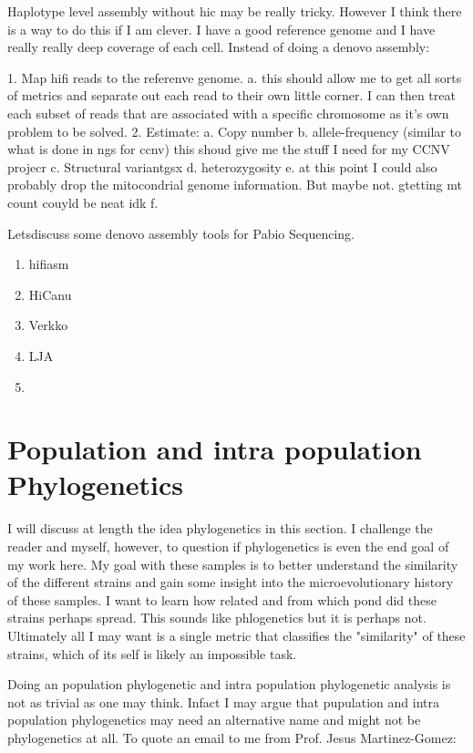 \documentclass{article}
\begin{document}
    Haplotype level assembly without hic may be really tricky.  However I think there is a way to do this if I am clever.   I have a good reference genome and I have really really deep coverage of each cell.   Instead of doing a denovo assembly:

    1. Map hifi reads to the referenve genome.      
        a. this should allow me to get all sorts of metrics and separate out each read to their own little corner.   I can then treat each subset of reads that are associated with a specific chromosome as it's own problem to be solved.
    2. Estimate:
        a. Copy number
        b. allele-frequency (similar to what is done in ngs for ccnv)  this shoud give me the stuff I need for my CCNV projecr
        c. Structural variantgsx
        d. heterozygosity
        e. at this point I could also probably drop the mitocondrial genome information.  But maybe not.  gtetting mt count couyld be neat idk
        f.
    
    Letsdiscuss some denovo assembly tools for Pabio Sequencing.
    \begin{enumerate}
        \item hifiasm
        \item HiCanu
        \item Verkko
        \item LJA
        \item 
    \end{enumerate}
    \newpage
    \section{Population and intra population Phylogenetics}
    I will discuss at length the idea phylogenetics in this section.   I challenge the reader and myself, however, to question if phylogenetics is even the end goal of my work here.   My goal with these samples is to better understand the similarity of the different strains and gain some insight into the microevolutionary history of these samples.   I want to learn how related and from which pond did these strains perhaps spread.   This sounds like phlogenetics but it is perhaps not.    Ultimately all I may want is a single metric that classifies the "similarity" of these strains, which of its self is likely an impossible task.

    Doing an population phylogenetic and intra population phylogenetic analysis is not as trivial as one may think.  Infact I may argue that pupulation and intra population phylogenetics may need an alternative name and might not be phylogenetics at all.   To quote an email to me from Prof. Jesus Martinez-Gomez:
\end{document}

